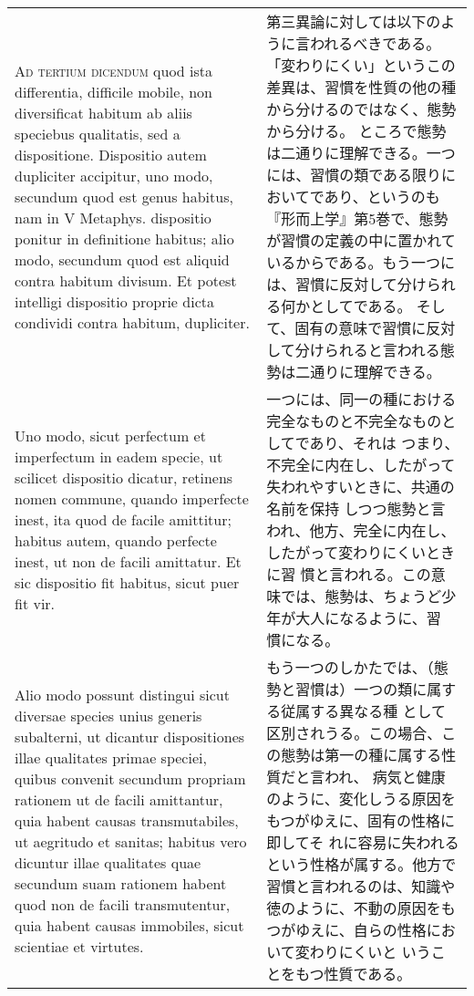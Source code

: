\documentclass[10pt]{jsarticle} %
\begin{document}
\begin{longtable}{p{21em}p{21em}}
\\



{\scshape Ad tertium dicendum} quod ista differentia, difficile mobile, non
diversificat habitum ab aliis speciebus qualitatis, sed a
dispositione. Dispositio autem dupliciter accipitur, uno modo,
secundum quod est genus habitus, nam in V Metaphys. dispositio ponitur
in definitione habitus; alio modo, secundum quod est aliquid contra
habitum divisum. Et potest intelligi dispositio proprie dicta
condividi contra habitum, dupliciter. 


&

第三異論に対しては以下のように言われるべきである。
「変わりにくい」というこの差異は、習慣を性質の他の種から分けるのではなく、態勢から分ける。
ところで態勢は二通りに理解できる。一つには、習慣の類である限りにおいてであり、というのも『形而上学』第5巻で、態勢が習慣の定義の中に置かれているからである。もう一つには、習慣に反対して分けられる何かとしてである。
そして、固有の意味で習慣に反対して分けられると言われる態勢は二通りに理解できる。

\\


Uno modo, sicut perfectum et
imperfectum in eadem specie, ut scilicet dispositio dicatur, retinens
nomen commune, quando imperfecte inest, ita quod de facile amittitur;
habitus autem, quando perfecte inest, ut non de facili amittatur. Et
sic dispositio fit habitus, sicut puer fit vir. 


&

一つには、同一の種における完全なものと不完全なものとしてであり、それは
つまり、不完全に内在し、したがって失われやすいときに、共通の名前を保持
しつつ態勢と言われ、他方、完全に内在し、したがって変わりにくいときに習
慣と言われる。この意味では、態勢は、ちょうど少年が大人になるように、習
慣になる。

\\

Alio modo possunt
distingui sicut diversae species unius generis subalterni, ut dicantur
dispositiones illae qualitates primae speciei, quibus convenit
secundum propriam rationem ut de facili amittantur, quia habent causas
transmutabiles, ut aegritudo et sanitas; habitus vero dicuntur illae
qualitates quae secundum suam rationem habent quod non de facili
transmutentur, quia habent causas immobiles, sicut scientiae et
virtutes. 


&

もう一つのしかたでは、（態勢と習慣は）一つの類に属する従属する異なる種
として区別されうる。この場合、この態勢は第一の種に属する性質だと言われ、
病気と健康のように、変化しうる原因をもつがゆえに、固有の性格に即してそ
れに容易に失われるという性格が属する。他方で習慣と言われるのは、知識や
徳のように、不動の原因をもつがゆえに、自らの性格において変わりにくいと
いうことをもつ性質である。


\end{longtable}
\end{document}
